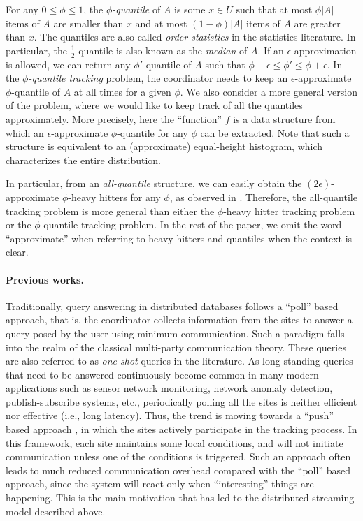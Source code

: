 \documentclass[10pt]{article}
\newcommand{\eps}{\epsilon}
\begin{document}
For any $0 \le \phi \le 1$, the {\em $\phi$-quantile} of $A$ is some $x \in
U$ such that at most $\phi |A|$ items of $A$ are smaller than $x$ and at
most $(1-\phi)|A|$ items of $A$ are greater than $x$.  The quantiles are
also called {\em order statistics} in the statistics literature.  In
particular, the $\frac{1}{2}$-quantile is also known as the {\em median} of
$A$.  If an $\eps$-approximation is allowed, we can return any
$\phi'$-quantile of $A$ such that $\phi - \eps \le \phi' \le \phi + \eps$.
In the {\em $\phi$-quantile tracking} problem, the coordinator needs to
keep an $\eps$-approximate $\phi$-quantile of $A$ at all times for a given
$\phi$.  We also consider a more general version of the problem, where we
would like to keep track of all the quantiles approximately.  More
precisely, here the ``function'' $f$ is a data structure from which an
$\eps$-approximate $\phi$-quantile for any $\phi$ can be extracted.  Note
that such a structure is equivalent to an (approximate) equal-height
histogram, which characterizes the entire distribution.

In particular, from an {\em all-quantile} structure, we can easily obtain
the $(2\eps)$-approximate $\phi$-heavy hitters for any $\phi$, as observed
in \cite{Cormode:Garofalakis:Muthukrishnan:Rastogi:05}.  Therefore, the
all-quantile tracking problem is more general than either the
$\phi$-heavy hitter tracking problem or the $\phi$-quantile tracking
problem.  In the rest of the paper, we omit the word ``approximate'' when
referring to heavy hitters and quantiles when the context is clear.

\paragraph{Previous works.}
Traditionally, query answering in distributed databases follows a ``poll''
based approach, that is, the coordinator collects information from the
sites to answer a query posed by the user using minimum communication.
Such a paradigm falls into the realm of the classical multi-party
communication theory.  These queries are also referred to as {\em one-shot}
queries in the literature.  As long-standing queries that need to be
answered continuously become common in many modern applications such as
sensor network monitoring, network anomaly detection, publish-subscribe
systems, etc., periodically polling all the sites is neither efficient nor
effective (i.e., long latency).  Thus, the trend is moving towards a
``push'' based approach \cite{Jain:Hellerstein:Ratnasamy:Wetherall:04}, in
which the sites actively participate in the tracking process.  In this
framework, each site maintains some local conditions, and will not initiate
communication unless one of the conditions is triggered.  Such an approach
often leads to much reduced communication overhead compared with the
``poll'' based approach, since the system will react only when
``interesting'' things are happening.  This is the main motivation that has
led to the distributed streaming model described above.
\end{document}
